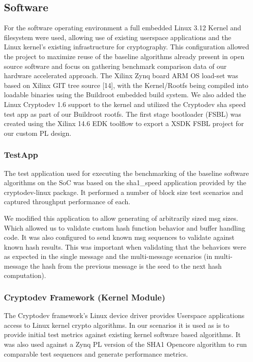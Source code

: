 \documentclass[journal]{IEEEtran}
\begin{document}
\subsection{Software}
For the software operating environment a full embedded Linux 3.12 Kernel and filesystem were used, allowing use of existing userspace applications and the Linux kernel’s existing infrastructure for cryptography.\cite{WIKPE2013} \cite{OCF2013} This configuration allowed the project to maximize reuse of the baseline algorithms already present in open source software and focus on gathering benchmark comparison data of our hardware accelerated approach.  The Xilinx Zynq board ARM OS load-set was based on Xilinx GIT tree source [14], with the Kernel/Rootfs being compiled into loadable binaries using the Buildroot \cite{BUILDROOT2013} embedded build system. We also added the Linux Cryptodev 1.6 support to the kernel and utilized the Cryptodev sha speed test app as part of our Buildroot rootfs.  The first stage bootloader (FSBL) was created using the Xilinx 14.6 EDK toolflow to export a XSDK FSBL project for our custom PL design.
\subsubsection{TestApp}
The test application used for executing the benchmarking of the baseline software algorithms on the SoC was based on the sha1\_speed application provided by the cryptodev-linux package.  It performed a number of block size test scenarios and captured throughput performance of each.

We modified this application to allow generating of arbitrarily sized msg sizes.  Which allowed us to validate custom hash function behavior and buffer handling code.  It was also configured to send known msg sequences to validate against known hash results.  This was important when validating that the behaviors were as expected in the single message and the multi-message scenarios (in multi-message the hash from the previous message is the seed to the next hash computation).
\subsubsection{Cryptodev Framework (Kernel Module)}
The Cryptodev framework's Linux device driver provides Userspace applications access to Linux kernel crypto algorithms.  In our scenarios it is used as is to provide initial test metrics against existing kernel software based algorithms.  It was also used against a Zynq PL version of the SHA1 Opencore algorithm to run comparable test sequences and generate performance metrics.
\end{document}
